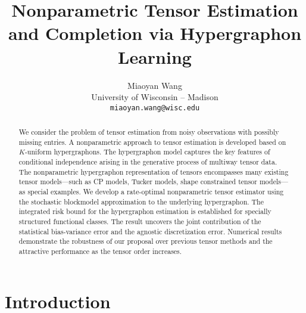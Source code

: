\documentclass{article}
\title{Nonparametric Tensor Estimation and Completion via Hypergraphon Learning}
\author{%
Miaoyan Wang \\
 University of Wisconsin -- Madison\\
\texttt{miaoyan.wang@wisc.edu}
}
\theoremstyle{plain}
\theoremstyle{definition}
\begin{document}
\maketitle


\begin{abstract}
We consider the problem of tensor estimation from noisy observations with possibly missing entries. A nonparametric approach to tensor estimation is developed based on $K$-uniform hypergraphons. The hypergraphon model captures the key features of conditional independence arising in the generative process of multiway tensor data. The nonparametric hypergraphon representation of tensors encompasses many existing tensor models---such as CP models, Tucker models, shape constrained tensor models---as special examples. We develop a rate-optimal nonparametric tensor estimator using the stochastic blockmodel approximation to the underlying hypergraphon. %
The integrated risk bound for the hypergraphon estimation is established for specially structured functional classes. The result uncovers the joint contribution of the statistical bias-variance error and the agnostic discretization error. Numerical results demonstrate the robustness of our proposal over previous tensor methods and the attractive performance as the tensor order increases.
\end{abstract}

\section{Introduction}
\end{document}
